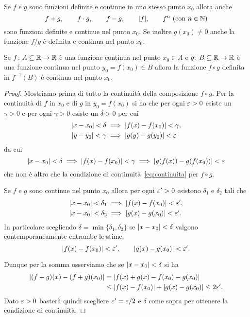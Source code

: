 \begin{theorem}
\label{th:continuita_composizione}
Se $f$ e $g$ sono funzioni definite e continue
in uno stesso punto $x_0$
allora anche
\[
  f+g, \qquad
  f\cdot g, \qquad
  f-g, \qquad
  {\left|f\right|}, \qquad
  f^n\ \text{(con $n\in \mathbb N$)}
\]
sono funzioni definite e continue nel punto $x_0$.
Se inoltre $g(x_0)\neq 0$ anche la funzione
$f/g$
è definita e continua nel punto $x_0$.

Se $f\colon A\subseteq \mathbb R \to \mathbb R$ è una funzione continua
nel punto $x_0\in A$ e
$g\colon B\subseteq \mathbb R \to \mathbb R$ è una funzione
continua nel punto $y_0=f(x_0)\in B$ allora la funzione $f\circ g$
definita in $f^{-1}(B)$ è continua nel punto $x_0$.
\end{theorem}
%
\begin{proof}
Mostriamo prima di tutto la continuità
della composizione $f\circ g$.
Per la continuità di $f$ in $x_0$ e di $g$ in $y_0=f(x_0)$
si ha che per ogni $\varepsilon>0$ esiste un $\gamma>0$
e per ogni $\gamma>0$ esiste un $\delta>0$ per cui
\begin{align*}
 {\left|x-x_0\right|}< \delta &\implies {\left|f(x)-f(x_0)\right|}<\gamma,\\
 {\left|y-y_0\right|}< \gamma & \implies {\left|g(y)-g(y_0)\right|}<\varepsilon
\end{align*}
da cui
\[
{\left|x-x_0\right|}< \delta
\implies {\left|f(x)-f(x_0)\right|}< \gamma
\implies {\left|g(f(x))-g(f(x_0))\right|} < \varepsilon
\]
che non è altro che la condizione di
continuità~\eqref{eq:continuita} per $f\circ g$.

Se $f$ e $g$ sono continue nel punto $x_0$
allora per ogni $\varepsilon'>0$ esistono $\delta_1$
e $\delta_2$ tali che
\begin{align*}
 {\left|x-x_0\right|} < \delta_1 &\implies {\left|f(x)-f(x_0)\right|} < \varepsilon',
 \\
 {\left|x-x_0\right|} < \delta_2 &\implies {\left|g(x)-g(x_0)\right|} < \varepsilon'.
\end{align*}
In particolare scegliendo $\delta = \min\{\delta_1,\delta_2\}$
se ${\left|x-x_0\right|} < \delta$ valgono contemporaneamente
entrambe le stime:
\[
 {\left|f(x)-f(x_0)\right|}< \varepsilon', \qquad
 {\left|g(x)-g(x_0)\right|}< \varepsilon'.
\]

Dunque per la somma osserviamo che se ${\left|x-x_0\right|}<\delta$
si ha
\begin{align*}
 {\left|(f+g)(x) - (f+g)(x_0)\right|}
  &= {\left|f(x)+g(x)-f(x_0)-g(x_0)\right|}\\
  &\le {\left|f(x)-f(x_0)\right|} + {\left|g(x)-g(x_0)\right|}
  \le 2 \varepsilon'.
\end{align*}
Dato $\varepsilon>0$ basterà quindi scegliere $\varepsilon' = \varepsilon / 2$
e $\delta$ come sopra per ottenere la condizione di continuità.


\end{proof}
